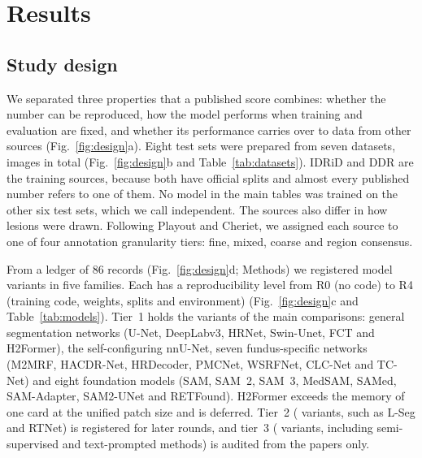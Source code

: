 \section{Results}

\subsection{Study design}
We separated three properties that a published score combines: whether the number can be reproduced, how the model performs when training and evaluation are fixed, and whether its performance carries over to data from other sources (Fig.~\ref{fig:design}a). Eight test sets were prepared from seven datasets,  images in total (Fig.~\ref{fig:design}b and Table~\ref{tab:datasets}). IDRiD and DDR are the training sources, because both have official splits and almost every published number refers to one of them. No model in the main tables was trained on the other six test sets, which we call independent. The sources also differ in how lesions were drawn. Following Playout and Cheriet\cite{playout2024crossdatasetgeneralization}, we assigned each source to one of four annotation granularity tiers: fine, mixed, coarse and region consensus.

From a ledger of 86 records (Fig.~\ref{fig:design}d; Methods) we registered  model variants in five families. Each has a reproducibility level from R0 (no code) to R4 (training code, weights, splits and environment) (Fig.~\ref{fig:design}c and Table~\ref{tab:models}). Tier~1 holds the  variants of the main comparisons: general segmentation networks (U-Net\cite{ronneberger2015unet}, DeepLabv3\cite{chen2017deeplabv3,chen2018deeplabv3plus}, HRNet\cite{wang2020hrnet}, Swin-Unet\cite{cao2022swinunet}, FCT\cite{tragakis2023fct} and H2Former\cite{he2023h2former}), the self-configuring nnU-Net\cite{isensee2021nnunet}, seven fundus-specific networks (M2MRF\cite{liu2023m2mrf}, HACDR-Net\cite{xu2024hacdrnet}, HRDecoder\cite{ding2024hrdecoder}, PMCNet\cite{he2022pmcnet}, WSRFNet\cite{li2024wsrfnet}, CLC-Net\cite{wang2023clcnet} and TC-Net\cite{zhang2023tcnet}) and eight foundation models (SAM\cite{kirillov2023sam}, SAM~2\cite{ravi2024sam2}, SAM~3\cite{carion2025sam3}, MedSAM\cite{ma2024medsam}, SAMed\cite{zhang2023samed}, SAM-Adapter\cite{chen2023samadapter}, SAM2-UNet\cite{xiong2024sam2unet} and RETFound\cite{zhou2023retfound}). H2Former exceeds the memory of one card at the unified patch size and is deferred. Tier~2 ( variants, such as L-Seg\cite{guo2019lseg} and RTNet\cite{huang2022rtnet}) is registered for later rounds, and tier~3 ( variants, including semi-supervised and text-prompted methods\cite{zhou2019collaborativesemisupervised,ullah2023ssmdunet,li2024tpdrseg}) is audited from the papers only.


